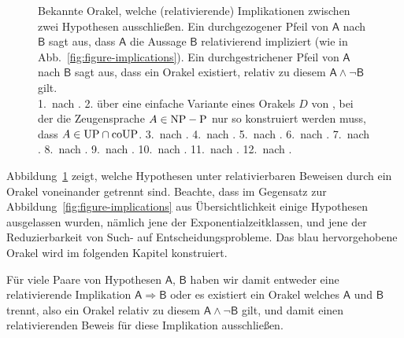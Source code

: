 \begin{figure}[p]
    \caption{Bekannte Orakel, welche (relativierende) Implikationen zwischen zwei Hypothesen ausschließen. Ein durchgezogener Pfeil von $\mathsf A$ nach $\mathsf B$ sagt aus, dass $\mathsf A$ die Aussage $\mathsf B$ relativierend impliziert (wie in Abb.~\ref{fig:figure-implications}). Ein durchgestrichener Pfeil von $\mathsf A$ nach $\mathsf B$ sagt aus, dass ein Orakel existiert, relativ zu diesem $\mathsf A\land\neg\mathsf B$ gilt.\\
    1.~nach \textcite[Thm.~5]{rackoff_relativized_1982}. 
    2. über eine einfache Variante eines Orakels $D$ von \textcite[Thm.~4.1]{dose_further_2020}, bei der die Zeugensprache $A\in\mathrm{NP}-\mathrm{P}$ nur so konstruiert werden muss, dass $A\in\mathrm{UP}\cap\mathrm{coUP}$. %
    3.~nach \textcite[Thm.~9]{ehrmanntraut_oracle_2022}.
    4.~nach \textcite[Thm.~4.1]{dose_np-completeness_2019}.
    5.~nach \textcite[Cor.~3.3]{dose_oracle_2020}.
    6.~nach \textcite[Thm.~3.2]{dose_further_2020}.
    7.~nach \textcite[Thm.~3.2]{fortnow_separability_2002}.
    8.~nach \textcite[Thm.~12.3]{fenner_inverting_2003}.
    9.~nach \textcite[Cor.~6.6]{glaser_disjoint_2004}.
    10.~nach \textcite[Thm.~5.1]{khaniki_new_2022}.
    11.~nach \textcite[Thm.~5.2]{khaniki_new_2022}.
    12.~nach \textcite[Satz~3.12]{dingel_separation_2022}.
}\label{fig:oracles}
    \forcerectofloat
\end{figure}

Abbildung~\ref{fig:oracles} zeigt, welche Hypothesen unter relativierbaren Beweisen durch ein Orakel voneinander getrennt sind.
Beachte, dass im Gegensatz zur Abbildung~\ref{fig:figure-implications} aus Übersichtlichkeit einige Hypothesen ausgelassen wurden, nämlich jene der Exponentialzeitklassen, und jene der Reduzierbarkeit von Such- auf Entscheidungsprobleme.
Das blau hervorgehobene Orakel \todo{} wird im folgenden Kapitel konstruiert.

Für viele Paare von Hypothesen $\mathsf{A}$, $\mathsf{B}$ haben wir damit entweder eine relativierende Implikation $\mathsf{A}\Rightarrow\mathsf{B}$ oder es existiert ein Orakel welches $\mathsf{A}$ und $\mathsf{B}$ trennt,  also ein Orakel relativ zu diesem $\mathsf{A}\land \neg\mathsf{B}$ gilt, und damit einen relativierenden Beweis für diese Implikation ausschließen. 

